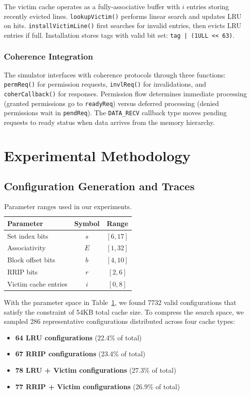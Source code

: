 \documentclass[sigconf,nonacm,natbib=false]{acmart}
\begin{document}
The victim cache operates as a fully-associative buffer with $i$ entries storing recently evicted lines. \texttt{lookupVictim()} performs linear search and updates LRU on hits. \texttt{installVictimLine()} first searches for invalid entries, then evicts LRU entries if full. Installation stores tags with valid bit set: \texttt{tag | (1ULL << 63)}.

\subsubsection{Coherence Integration}

The simulator interfaces with coherence protocols through three functions: \texttt{permReq()} for permission requests, \texttt{invlReq()} for invalidations, and \texttt{coherCallback()} for responses. Permission flow determines immediate processing (granted permissions go to \texttt{readyReq}) versus deferred processing (denied permissions wait in \texttt{pendReq}). The \texttt{DATA\_RECV} callback type moves pending requests to ready status when data arrives from the memory hierarchy.


\section{Experimental Methodology}

\subsection{Configuration Generation and Traces}

\begin{table}[t]
\centering
\caption{Parameter ranges used in our experiments.}
\label{tab:param-ranges}
\begin{tabular}{|l|c|c|}
\hline
\textbf{Parameter} & \textbf{Symbol} & \textbf{Range} \\
\hline
Set index bits & $s$ & $[6,17]$ \\
Associativity & $E$ & $[1,32]$ \\
Block offset bits & $b$ & $[4,10]$ \\
RRIP bits & $r$ & $[2,6]$ \\
Victim cache entries & $i$ & $[0,8]$ \\
\hline
\end{tabular}
\end{table}


With the parameter space in Table~\ref{tab:param-ranges}, we found 7732 valid configurations that satisfy the constraint of 54KB total cache size. To compress the search space, we sampled 286 representative configurations distributed across four cache types:
\begin{itemize}
\item \textbf{64 LRU configurations} (22.4\% of total)
\item \textbf{67 RRIP configurations} (23.4\% of total)  
\item \textbf{78 LRU + Victim configurations} (27.3\% of total)
\item \textbf{77 RRIP + Victim configurations} (26.9\% of total)
\end{itemize}
\end{document}
